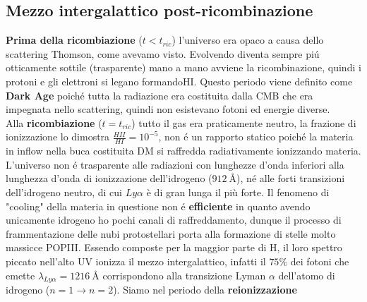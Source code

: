 \documentclass[12pt, a4paper]{article}
\begin{document}
\subsection{Mezzo intergalattico post-ricombinazione}
\textbf{Prima della ricombiazione} ($t<t_{ric}$) l'universo era opaco a causa dello scattering Thomson, come avevamo visto. Evolvendo diventa sempre pi\'{u} otticamente sottile (trasparente) mano a mano avviene la ricombinazione, quindi i protoni e gli elettroni si legano formandoHI. Questo periodo viene definito come \textbf{Dark Age} poich\'{e} tutta la radiazione era costituita dalla CMB che era impegnata nello scattering, quindi non esistevano fotoni ed energie diverse.\\
Alla \textbf{ricombiazione} ($t=t_{ric}$) tutto il gas era praticamente neutro, la frazione di ionizzazione lo dimostra $\frac{HII}{HI}=10^{-5}$, non \'{e} un rapporto statico poich\'{e} la materia in inflow nella buca costituita DM si raffredda radiativamente ionizzando materia. L'universo non \'{e} trasparente alle radiazioni con lunghezze d'onda inferiori alla lunghezza d'onda di ionizzazione dell'idrogeno ($\SI{912}{\angstrom}$), né alle forti transizioni dell'idrogeno neutro, di cui $Ly\alpha$ è di gran lunga il più forte. Il fenomeno di "cooling" della materia in questione non \'{e} \textbf{efficiente} in quanto avendo unicamente idrogeno ho pochi canali di raffreddamento, dunque il processo di frammentazione delle nubi protostellari porta alla formazione di stelle molto massicce POPIII. Essendo composte per la maggior parte di H, il loro spettro piccato nell'alto UV ionizza il mezzo intergalattico, infatti il $75\%$ dei fotoni che emette $\lambda_{Ly \alpha}=\SI{1216}{\angstrom}$ corrispondono alla transizione Lyman $\alpha$ dell'atomo di idrogeno ($n=1 \rightarrow n=2$). Siamo nel periodo della \textbf{reionizzazione} 
\end{document}
